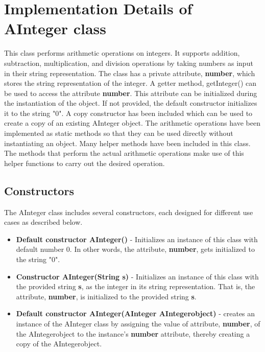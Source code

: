 \documentclass[a4paper,12pt]{article}
\begin{document}
{\section{Implementation Details of AInteger class}
This class performs arithmetic operations on integers. It supports addition, subtraction, multiplication, and division operations by taking numbers as input in their string representation. The class has a private attribute, \textbf{number}, which stores the string representation of the integer. A getter method, getInteger() can be used to access the attribute \textbf{number}. This attribute can be initialized during the instantiation of the object. If not provided, the default constructor initializes it to the string "$0$". A copy constructor has been included which can be used to create a copy of an existing AInteger object. The arithmetic operations have been implemented as static methods so that they can be used directly without instantiating an object. Many helper methods have been included in this class. The methods that perform the actual arithmetic operations make use of this helper functions to carry out the desired operation.

\subsection{Constructors}
The AInteger class includes several constructors, each designed for different use cases as described below.

\begin{itemize}
    \item \textbf{Default constructor AInteger()} - Initializes an instance of this class with default number $0$. In other words, the attribute, \textbf{number}, gets initialized to the string "$0$".
    \item \textbf{Constructor AInteger(String s)} - Initializes an instance of this class with the provided string \textbf{s}, as the integer in its string representation. That is, the attribute, \textbf{number}, is initialized to the provided string \textbf{s}.
    \item \textbf{Default constructor AInteger(AInteger AIntegerobject)} - creates an instance of the AInteger class by assigning the value of attribute, \textbf{number}, of the AIntegerobject to the instance's \textbf{number} attribute, thereby creating a copy of the AIntegerobject.
\end{itemize}

}
\end{document}
